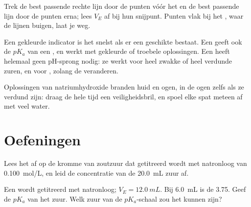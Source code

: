 \begin{method}\label{met:g12:ph-conductivity-titrations:two-lines}
Trek de best passende rechte lijn door de punten vóór het
 en de best passende lijn door de punten erna; lees $V_E$
af bij hun snijpunt. Punten vlak bij het , waar de lijnen
buigen, laat je weg.
\end{method}

\begin{remark}\label{rem:g12:ph-conductivity-titrations:which}
Een gekleurde indicator is het snelst als er een geschikte bestaat. Een
 geeft ook de $pK_a$ van een , en werkt met
gekleurde of troebele oplossingen. Een  heeft
helemaal geen pH-sprong nodig: ze werkt voor heel zwakke of heel verdunde
zuren, en voor , zolang de  veranderen.
\end{remark}

\begin{safety}{}
Oplossingen van natriumhydroxide branden huid en ogen, in de ogen zelfs
als ze verdund zijn: draag de hele tijd een veiligheidsbril, en spoel
elke spat meteen af met veel water.
\end{safety}

\section{Oefeningen}


\begin{exercise}[$\star$]\label{exo:g12:ph-conductivity-titrations:1}
Lees het  af op de kromme van zoutzuur dat getitreerd
wordt met natronloog van \qty{0.100}{mol/L}, en leid de concentratie van
de \qty{20.0}{mL} zuur af.
\end{exercise}

\begin{exercise}[$\star$]\label{exo:g12:ph-conductivity-titrations:2}
Een  wordt getitreerd met natronloog; $V_E = \qty{12.0}{mL}$.
Bij \qty{6.0}{mL} is de  3.75. Geef de $pK_a$ van het zuur. Welk zuur
van de $pK_a$-schaal zou het kunnen zijn?
\end{exercise}

